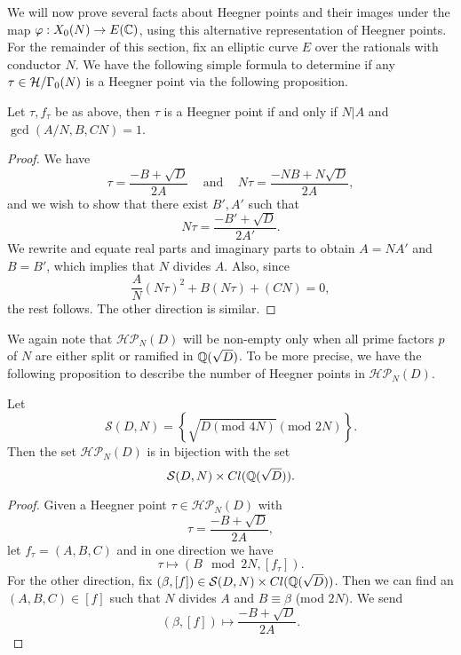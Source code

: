 We will now prove several facts about Heegner points and their images under the map $\varphi:X_0(N) \to E(\mathbb{C})$, using this alternative representation of Heegner points. For the remainder of this section, fix an elliptic curve $E$ over the rationals with conductor $N$.
We have the following simple formula to determine if any $\tau \in \mathcal{H}/\Gamma_0(N)$ is a Heegner point via the following proposition.
\begin{prop}
Let $\tau, f_\tau$ be as above, then $\tau$ is a Heegner point if and only if $N|A$ and $\gcd(A/N,B,CN) = 1$.
\end{prop}
\begin{proof}
We have 
$$\tau = \frac{-B + \sqrt{D}}{2A} \;\;\;\text{ and }\;\;\; N\tau = \frac{-NB + N\sqrt{D}}{2A},$$
and we wish to show that there exist $B',A'$ such that 
$$N\tau = \frac{-B' + \sqrt{D}}{2A'}.$$
We rewrite and equate real parts and imaginary parts to obtain
$A = NA'$ and $B = B'$, which implies that $N$ divides $A$. 
Also, since
$$\frac{A}{N}(N\tau)^2 + B(N\tau) + (CN) = 0,$$
the rest follows. The other direction is similar.
\end{proof}
We again note that $\mathcal{HP}_N(D)$ will be non-empty only when all prime factors $p$ of $N$ are either split or ramified in $\mathbb{Q}(\sqrt{D})$. To be more precise, we have the following proposition to describe the number of Heegner points in $\mathcal{HP}_N(D)$.
\begin{prop} 
Let 
$$\mathcal{S}(D,N) = \left\{\sqrt{D (\text{mod } 4N)} (\text{mod } 2N)\right\}.$$ 
Then the set $\mathcal{HP}_N(D)$ is in bijection with the set 
$$\mathcal{S}(D,N) \times Cl(\mathbb{Q}(\sqrt{D})).$$
\end{prop}
\begin{proof}
Given a Heegner point $\tau \in \mathcal{HP}_N(D)$ with
$$\tau = \frac{-B + \sqrt{D}}{2A},$$ 
let $f_\tau = (A,B,C)$ and in one direction we have
$$\tau \longmapsto (B\mod 2N, [f_\tau]).$$
For the other direction, fix $(\beta,[f]) \in \mathcal{S}(D,N) \times Cl(\mathbb{Q}(\sqrt{D}))$. Then we can find an $(A,B,C) \in [f]$ such that $N$ divides $A$ and $B \equiv \beta$ (mod $2N)$. We send
$$(\beta,[f]) \longmapsto \frac{-B + \sqrt{D}}{2A}.$$
\end{proof}

